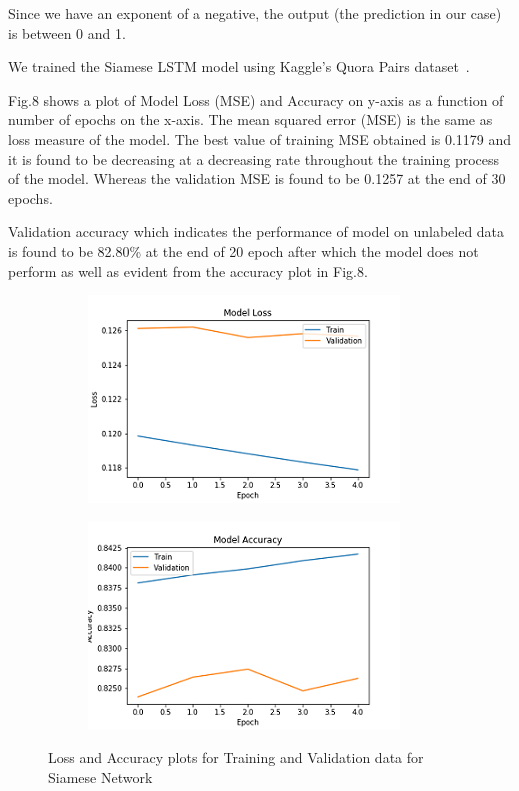 \documentclass[runningheads]{llncs}
\begin{document}
	Since we have an exponent of a negative, the output (the prediction in our case) is between 0 and 1.
	
	We trained the Siamese LSTM model using Kaggle's Quora Pairs dataset~\cite{ref_url25}. 	
	
	Fig.8 shows a plot of Model Loss (MSE) and Accuracy on y-axis as a function of number of epochs on the x-axis.
	The mean squared error (MSE) is the same as loss measure of the model. The best value of training MSE obtained is 0.1179 and it is found to be decreasing at a decreasing rate throughout the training process of the model. Whereas the validation MSE is found to be 0.1257 at the end of 30 epochs.
	
	Validation accuracy which indicates the performance of model on unlabeled data is found to be 82.80\% at the end of 20 epoch after which the model does not perform as well as evident from the accuracy plot in Fig.8.
	
	\begin{figure}[H]
		\begin{subfigure}[b]{0.51\textwidth}
			\includegraphics[width=\textwidth]{siamese_eng_loss.png}
			\label{fig:Model Loss}
		\end{subfigure}
		\hfill
		\begin{subfigure}[b]{0.51\textwidth}
			\includegraphics[width=\textwidth]{siamese_eng_acc.png}
			\label{fig:Model Accuracy}
		\end{subfigure}
		\caption{Loss and Accuracy plots for Training and Validation data for Siamese Network}
	\end{figure}
	
\end{document}
